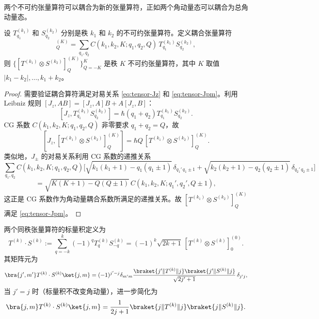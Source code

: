 两个不可约张量算符可以耦合为新的张量算符，正如两个角动量态可以耦合为总角动量态。
\begin{proposition}[张量算符的耦合]
设 $T^{(k_1)}_{q_1}$ 和 $S^{(k_2)}_{q_2}$ 分别是秩 $k_1$ 和 $k_2$ 的不可约张量算符。定义耦合张量算符
\begin{equation}
[T^{(k_1)}\otimes S^{(k_2)}]^{(K)}_Q
=\sum_{q_1,q_2}C(k_1,k_2,K;q_1,q_2,Q)\,T^{(k_1)}_{q_1}S^{(k_2)}_{q_2},
\label{eq:tensor-product-op}
\end{equation}
则 $\{[T^{(k_1)}\otimes S^{(k_2)}]^{(K)}_Q\}_{Q=-K}^K$ 是秩 $K$ 不可约张量算符，其中 $K$ 取值 $|k_1-k_2|,\dots,k_1+k_2$。
\end{proposition}
\begin{proof}
需要验证耦合算符满足对易关系 \cref{eq:tensor-Jz} 和 \cref{eq:tensor-Jpm}。利用 Leibniz 规则 $[J_z,AB]=[J_z,A]B+A[J_z,B]$：
\[
[J_z,T^{(k_1)}_{q_1}S^{(k_2)}_{q_2}]
=\hbar(q_1+q_2)T^{(k_1)}_{q_1}S^{(k_2)}_{q_2}.
\]
CG 系数 $C(k_1,k_2,K;q_1,q_2,Q)$ 非零要求 $q_1+q_2=Q$，故
\[
[J_z,[T^{(k_1)}\otimes S^{(k_2)}]^{(K)}_Q]
=\hbar Q\,[T^{(k_1)}\otimes S^{(k_2)}]^{(K)}_Q.
\]
类似地，$J_\pm$ 的对易关系利用 CG 系数的递推关系
\[
\sum_{q_1,q_2}C(k_1,k_2,K;q_1,q_2,Q)\bigl[\sqrt{k_1(k_1+1)-q_1(q_1\pm1)}\,\delta_{q_1'\,q_1\pm1}+\sqrt{k_2(k_2+1)-q_2(q_2\pm1)}\,\delta_{q_2'\,q_2\pm1}\bigr]
\]
\[
=\sqrt{K(K+1)-Q(Q\pm1)}\,C(k_1,k_2,K;q_1',q_2',Q\pm1),
\]
这正是 CG 系数作为角动量耦合系数所满足的递推关系。故 $[T^{(k_1)}\otimes S^{(k_2)}]^{(K)}_Q$ 满足 \cref{eq:tensor-Jpm}。
\end{proof}
\begin{proposition}[标量积的矩阵元]
两个同秩张量算符的标量积定义为
\[
T^{(k)}\cdot S^{(k)}:=\sum_{q=-k}^{k}(-1)^q T^{(k)}_q S^{(k)}_{-q}
=(-1)^k\sqrt{2k+1}\,[T^{(k)}\otimes S^{(k)}]^{(0)}_0.
\]
其矩阵元为
\begin{equation}
\bra{j',m'}T^{(k)}\cdot S^{(k)}\ket{j,m}
=(-1)^{j'-j}\delta_{m'm}\frac{\braket{j'\|T^{(k)}\|j}\braket{j'\|S^{(k)}\|j}}{\sqrt{2j'+1}}\,\delta_{j'j},
\label{eq:scalar-product-me}
\end{equation}
当 $j'=j$ 时（标量积不改变角动量），进一步简化为
\[
\bra{j,m}T^{(k)}\cdot S^{(k)}\ket{j,m}
=\frac{1}{2j+1}\braket{j\|T^{(k)}\|j}\braket{j\|S^{(k)}\|j}.
\]
\end{proposition}
